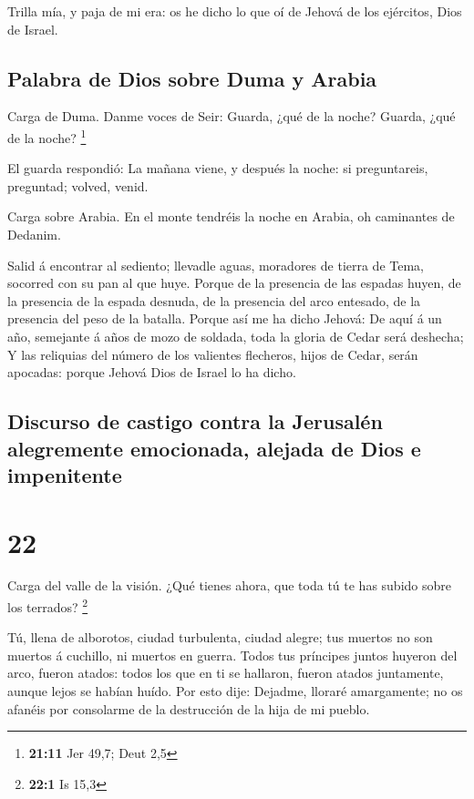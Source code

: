  Trilla mía, y paja de mi era: os he dicho lo que oí de
Jehová de los ejércitos, Dios de Israel.

\hypertarget{palabra-de-dios-sobre-duma-y-arabia}{%
\subsection{Palabra de Dios sobre Duma y
Arabia}\label{palabra-de-dios-sobre-duma-y-arabia}}

 Carga de Duma. Danme voces de Seir: Guarda, ¿qué de la
noche? Guarda, ¿qué de la noche? \footnote{\textbf{21:11} Jer 49,7; Deut
  2,5}

 El guarda respondió: La mañana viene, y después la
noche: si preguntareis, preguntad; volved, venid.

 Carga sobre Arabia. En el monte tendréis la noche en
Arabia, oh caminantes de Dedanim.

 Salid á encontrar al sediento; llevadle aguas, moradores
de tierra de Tema, socorred con su pan al que huye. 
Porque de la presencia de las espadas huyen, de la presencia de la
espada desnuda, de la presencia del arco entesado, de la presencia del
peso de la batalla.  Porque así me ha dicho Jehová: De
aquí á un año, semejante á años de mozo de soldada, toda la gloria de
Cedar será deshecha;  Y las reliquias del número de los
valientes flecheros, hijos de Cedar, serán apocadas: porque Jehová Dios
de Israel lo ha dicho.

\hypertarget{discurso-de-castigo-contra-la-jerusaluxe9n-alegremente-emocionada-alejada-de-dios-e-impenitente}{%
\subsection{Discurso de castigo contra la Jerusalén alegremente
emocionada, alejada de Dios e
impenitente}\label{discurso-de-castigo-contra-la-jerusaluxe9n-alegremente-emocionada-alejada-de-dios-e-impenitente}}

\hypertarget{section-21}{%
\section{22}\label{section-21}}

 Carga del valle de la visión. ¿Qué tienes ahora, que toda
tú te has subido sobre los terrados? \footnote{\textbf{22:1} Is 15,3}

 Tú, llena de alborotos, ciudad turbulenta, ciudad alegre;
tus muertos no son muertos á cuchillo, ni muertos en guerra.
 Todos tus príncipes juntos huyeron del arco, fueron
atados: todos los que en ti se hallaron, fueron atados juntamente,
aunque lejos se habían huído.  Por esto dije: Dejadme,
lloraré amargamente; no os afanéis por consolarme de la destrucción de
la hija de mi pueblo.

